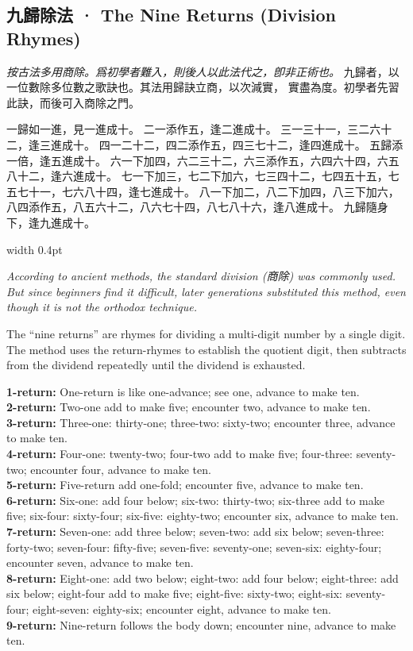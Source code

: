 \documentclass[10pt,a4paper]{article}
\newlength{\cnwidth}
\newlength{\enwidth}
\newcommand{\bilingual}[2]{%
  \noindent%
  \begin{minipage}[t]{\cnwidth}%
    #1%
  \end{minipage}%
  \hfill\vrule width 0.4pt\hfill%
  \begin{minipage}[t]{\enwidth}%
    #2%
  \end{minipage}%
  \par\smallskip%
}
\newcommand{\bilingualsubsection}[2]{%
  \subsection*{#1 · #2}
}
\begin{document}
\bilingualsubsection{九歸除法}{The Nine Returns (Division Rhymes)}

\bilingual{%
  \textit{按古法多用商除。爲初學者難入，則後人以此法代之，卽非正術也。}
  九歸者，以一位數除多位數之歌訣也。其法用歸訣立商，以次減實，
  實盡為度。初學者先習此訣，而後可入商除之門。

  一歸如一進，見一進成十。
  二一添作五，逢二進成十。
  三一三十一，三二六十二，逢三進成十。
  四一二十二，四二添作五，四三七十二，逢四進成十。
  五歸添一倍，逢五進成十。
  六一下加四，六二三十二，六三添作五，六四六十四，六五八十二，逢六進成十。
  七一下加三，七二下加六，七三四十二，七四五十五，七五七十一，七六八十四，逢七進成十。
  八一下加二，八二下加四，八三下加六，八四添作五，八五六十二，八六七十四，八七八十六，逢八進成十。
  九歸隨身下，逢九進成十。
}{%
  \textit{According to ancient methods, the standard division (商除) was commonly used.
  But since beginners find it difficult, later generations substituted this method,
  even though it is not the orthodox technique.}

  The ``nine returns'' are rhymes for dividing a multi-digit number by a single digit.
  The method uses the return-rhymes to establish the quotient digit, then subtracts
  from the dividend repeatedly until the dividend is exhausted.

  \textbf{1-return:} One-return is like one-advance; see one, advance to make ten.\\
  \textbf{2-return:} Two-one add to make five; encounter two, advance to make ten.\\
  \textbf{3-return:} Three-one: thirty-one; three-two: sixty-two; encounter three, advance to make ten.\\
  \textbf{4-return:} Four-one: twenty-two; four-two add to make five; four-three: seventy-two; encounter four, advance to make ten.\\
  \textbf{5-return:} Five-return add one-fold; encounter five, advance to make ten.\\
  \textbf{6-return:} Six-one: add four below; six-two: thirty-two; six-three add to make five; six-four: sixty-four; six-five: eighty-two; encounter six, advance to make ten.\\
  \textbf{7-return:} Seven-one: add three below; seven-two: add six below; seven-three: forty-two; seven-four: fifty-five; seven-five: seventy-one; seven-six: eighty-four; encounter seven, advance to make ten.\\
  \textbf{8-return:} Eight-one: add two below; eight-two: add four below; eight-three: add six below; eight-four add to make five; eight-five: sixty-two; eight-six: seventy-four; eight-seven: eighty-six; encounter eight, advance to make ten.\\
  \textbf{9-return:} Nine-return follows the body down; encounter nine, advance to make ten.
}
\end{document}
